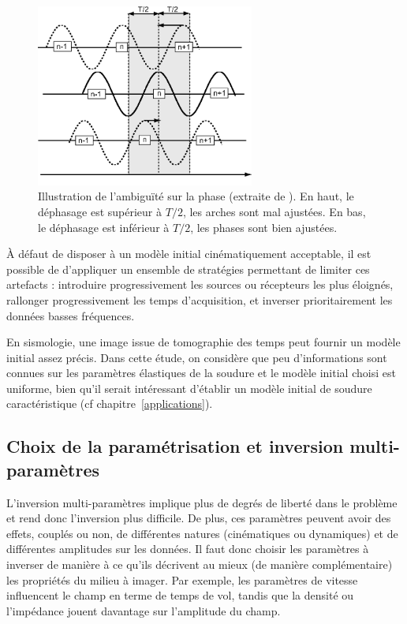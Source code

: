 \begin{figure}[!h]
	\centering
	\includegraphics[height=6cm]{img/ambig_phase.png}
	\caption{Illustration de l'ambiguïté sur la phase (extraite de \cite{brossier_these}). En haut, le déphasage est supérieur à $T/2$, les arches sont mal ajustées. En bas, le déphasage est inférieur à $T/2$, les phases sont bien ajustées. \label{ambig_phase}}
\end{figure}

À défaut de disposer à un modèle initial cinématiquement acceptable, il est possible de d'appliquer un ensemble de stratégies permettant de limiter ces artefacts : introduire progressivement les sources ou récepteurs les plus éloignés, rallonger progressivement les temps d'acquisition, et inverser prioritairement les données basses fréquences.


En sismologie, une image issue de tomographie des temps peut fournir un modèle initial assez précis. Dans cette étude, on considère que peu d'informations sont connues sur les paramètres élastiques de la soudure et le modèle initial choisi est uniforme, bien qu'il serait intéressant d'établir un modèle initial de soudure caractéristique (cf chapitre~\ref{applications}).


\subsection{Choix de la paramétrisation et inversion multi-paramètres}
L'inversion multi-paramètres implique plus de degrés de liberté dans le problème et rend donc l'inversion plus difficile. De plus, ces paramètres peuvent avoir des effets, couplés ou non, de différentes natures (cinématiques ou dynamiques) et de différentes amplitudes sur les données. Il faut donc choisir les paramètres à inverser de manière à ce qu'ils décrivent au mieux (de manière complémentaire) les propriétés du milieu à imager. Par exemple, les paramètres de vitesse influencent le champ en terme de temps de vol, tandis que la densité ou l'impédance jouent davantage sur l'amplitude du champ.\\


